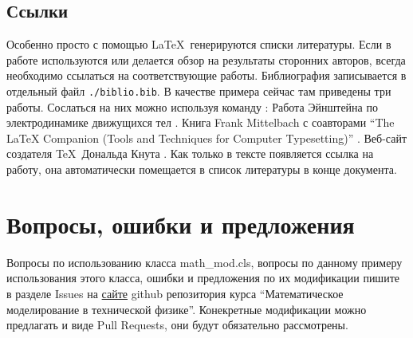 \documentclass[FN]{math_mod}
\begin{document}
\subsection{Ссылки}

Особенно просто с помощью \LaTeX~генерируются списки литературы. Если в работе используются или делается обзор на результаты сторонних авторов, всегда необходимо ссылаться на соответствующие работы. Библиография записывается в отдельный файл \texttt{./biblio.bib}. В качестве примера сейчас там приведены три работы. Сослаться на них можно используя команду \texttt{\cite{название работы}}: Работа Эйнштейна по электродинамике движущихся тел \cite{einstein}. Книга Frank Mittelbach с соавторами ``The LaTeX Companion (Tools and Techniques for Computer Typesetting)'' \cite{latexcompanion}. Веб-сайт создателя \TeX~Дональда Кнута \cite{knuthwebsite}. Как только в тексте появляется ссылка на работу, она автоматически помещается в список литературы в конце документа.  

\section{Вопросы, ошибки и предложения}

Вопросы по использованию класса math\_mod.cls, вопросы по данному примеру использования этого класса, ошибки и предложения по их модификации пишите в разделе Issues на \href{https://github.com/yakovenko-ivan/Mat_Model_for_Tech_Phys}{сайте} github репозитория курса ``Математическое моделирование в технической физике''. Конекретные модификации можно предлагать и виде Pull Requests, они будут обязательно рассмотрены.  


\end{document}
